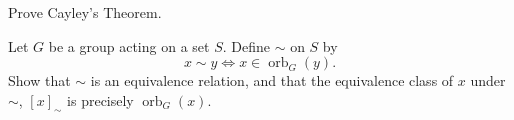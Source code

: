 \documentclass[./main.tex]{subfiles}
\begin{document}
\begin{exercise}
\label{ex:cayley-thm}
    Prove Cayley's Theorem. 
\end{exercise}

\begin{exercise}
\label{ex:orbits-partition-set}
    Let $G$ be a group acting on a set $S$. Define $\sim$ on $S$ by
    \[
        x \sim y \iff x \in \operatorname{orb}_G (y).
    \]
    Show that $\sim$ is an equivalence relation, and that the equivalence class
    of $x$ under $\sim$, $[x]_\sim$ is precisely $\operatorname{orb}_G(x)$. 
\end{exercise}
\end{document}
